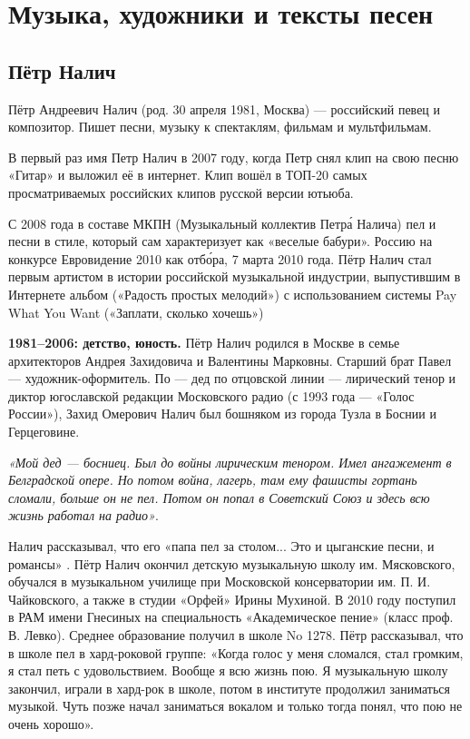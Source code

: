 \chapter{Музыка, художники и тексты песен}

\section{Пётр Налич}
Пётр Андреевич Налич (род. 30 апреля 1981, Москва) --- российский певец и композитор. Пишет песни, музыку к спектаклям, фильмам и мультфильмам.

В первый раз имя Петр Налич  в 2007 году, когда Петр снял клип на свою песню «Гитар» и выложил её в интернет. Клип вошёл в ТОП-20 самых просматриваемых российских клипов русской версии ютьюба.

С 2008 года в составе МКПН (Музыкальный коллектив Петр\'{а} Налича) пел и  песни в стиле, который сам характеризует как «веселые бабури».  Россию на конкурсе Евровидение 2010 как  отб\'{о}ра,  7 марта 2010 года. Пётр Налич стал первым артистом в истории российской музыкальной индустрии, выпустившим в Интернете альбом («Радость простых мелодий») с использованием системы Pay What You Want («Заплати, сколько хочешь»)

\textbf{1981--2006: детство, юность.}
Пётр Налич родился в Москве в семье архитекторов Андрея Захидовича и Валентины Марковны. Старший брат Павел --- художник-оформитель. По  --- дед по отцовской линии --- лирический тенор и диктор югославской редакции Московского радио (с 1993 года --- «Голос России»), Захид Омерович Налич был бошняком из города Тузла в Боснии и Герцеговине.

{\it «Мой дед --- босниец. Был до войны лирическим тенором. Имел ангажемент в Белградской опере. Но потом война, лагерь, там ему фашисты гортань сломали, больше он не пел. Потом он попал в Советский Союз и здесь всю жизнь работал на радио»}.

Налич рассказывал, что его «папа  пел за столом... Это и цыганские песни, и романсы» . Пётр Налич окончил детскую музыкальную школу им. Мясковского, обучался в музыкальном училище при Московской консерватории им. П. И. Чайковского, а также в студии «Орфей»  Ирины Мухиной. В 2010 году поступил в РАМ имени Гнесиных на специальность «Академическое пение» (класс проф. В. Левко). Среднее образование получил в школе No 1278. Пётр рассказывал, что в школе пел в хард-роковой группе: «Когда голос у меня сломался, стал громким, я стал петь с удовольствием. Вообще я всю жизнь пою. Я музыкальную школу закончил, играли в хард-рок в школе, потом в институте продолжил заниматься музыкой. Чуть позже начал заниматься вокалом и только тогда понял, что пою не очень хорошо».

